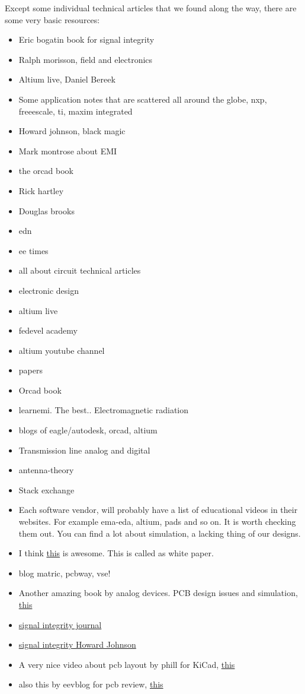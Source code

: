 \documentclass[12pt]{article}
\begin{document}
Except some individual technical articles that we found along the way, there are some very basic resources:
\begin{itemize}
		\item Eric bogatin book for signal integrity
		\item Ralph morisson, field and electronics
		\item Altium live, Daniel Bereek
		\item Some application notes that are scattered all around the globe, nxp, freeescale, ti, maxim integrated
		\item Howard johnson, black magic
		\item Mark montrose about EMI
		\item the orcad book
		\item Rick hartley
		\item Douglas brooks
		\item edn 
		\item ee times
		\item all about circuit technical articles
		\item electronic design
		\item altium live
		\item fedevel academy
		\item altium youtube channel
		\item papers
		\item Orcad book
		\item learnemi. The best.. Electromagnetic radiation
		\item blogs of eagle/autodesk, orcad, altium
		\item Transmission line analog and digital
		\item antenna-theory
		\item Stack exchange
		\item Each software vendor, will probably have a list of educational videos in their websites. For example ema-eda, altium, pads and so on. It is worth checking them out. You can find a lot about simulation, a lacking thing of our designs.
		\item I think \href{https://www.technolution.eu/uploads/2013/08/objective-white-paper-nr5-2006.pdf}{this} is awesome. This is called as white paper.
		\item blog matric, pcbway, vse!
		\item Another amazing book by analog devices. PCB design issues and simulation, \href{https://www.analog.com/en/education/education-library/linear-circuit-design-handbook.html}{this}
		\item \href{https://www.signalintegrityjournal.com/}{signal integrity journal}
		\item \href{http://www.sigcon.com/}{signal integrity Howard Johnson}
		\item A very nice video about pcb layout by phill for KiCad, \href{https://www.youtube.com/watch?v=t5phi3nT8OU&t=4940s}{this}
		\item also this by eevblog for pcb review, \href{https://www.youtube.com/watch?v=xhRhsCVF8mE}{this}
\end{itemize}
\end{document}
